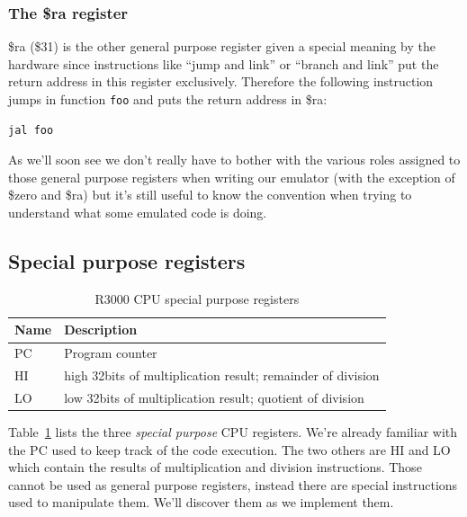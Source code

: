 \documentclass[a4paper]{article}
\newcommand{\code}[1] {\texttt{#1}}
\begin{document}
\subsubsection{The \$ra register}

\$ra (\$31) is the other general purpose register given a special
meaning by the hardware since instructions like ``jump and link'' or
``branch and link'' put the return address in this register
exclusively. Therefore the following instruction jumps in function
\code{foo} and puts the return address in \$ra:

\begin{lstlisting}[language=assembly]
jal foo
\end{lstlisting}

As we'll soon see we don't really have to bother with the various
roles assigned to those general purpose registers when writing our
emulator (with the exception of \$zero and \$ra) but it's still useful
to know the convention when trying to understand what some emulated
code is doing.

\subsection{Special purpose registers}

\begin{table}[ht]
  \centering

  \begin{tabular}{ l | l }
    Name        & Description     \\
    \hline
    PC          & Program counter \\
    HI          & high 32bits of multiplication result; remainder of
                  division \\
    LO          & low 32bits of multiplication result; quotient of
                  division \\
  \end{tabular}

  \caption{R3000 CPU special purpose registers}
  \label{tab:specialcpuregs}
\end{table}

Table~\ref{tab:specialcpuregs} lists the three \emph{special purpose}
CPU registers. We're already familiar with the PC used to keep track
of the code execution. The two others are HI and LO which contain the
results of multiplication and division instructions. Those cannot be
used as general purpose registers, instead there are special
instructions used to manipulate them. We'll discover them as we
implement them.
\end{document}
